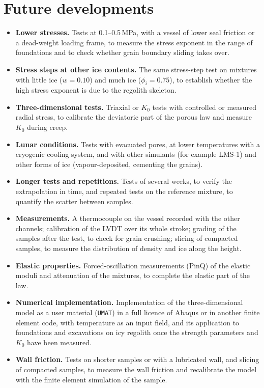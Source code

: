 \section{Future developments}
\begin{itemize}
    \item \textbf{Lower stresses.} Tests at 0.1--0.5\,MPa, with a vessel of lower seal friction or a dead-weight loading frame, to measure the stress exponent in the range of foundations and to check whether grain boundary sliding takes over.
    \item \textbf{Stress steps at other ice contents.} The same stress-step test on mixtures with little ice ($w = 0.10$) and much ice ($\phi_i = 0.75$), to establish whether the high stress exponent is due to the regolith skeleton.
    \item \textbf{Three-dimensional tests.} Triaxial or $K_0$ tests with controlled or measured radial stress, to calibrate the deviatoric part of the porous law and measure $K_0$ during creep.
    \item \textbf{Lunar conditions.} Tests with evacuated pores, at lower temperatures with a cryogenic cooling system, and with other simulants (for example LMS-1) and other forms of ice (vapour-deposited, cementing the grains).
    \item \textbf{Longer tests and repetitions.} Tests of several weeks, to verify the extrapolation in time, and repeated tests on the reference mixture, to quantify the scatter between samples.
    \item \textbf{Measurements.} A thermocouple on the vessel recorded with the other channels; calibration of the LVDT over its whole stroke; grading of the samples after the test, to check for grain crushing; slicing of compacted samples, to measure the distribution of density and ice along the height.
    \item \textbf{Elastic properties.} Forced-oscillation measurements (PinQ) of the elastic moduli and attenuation of the mixtures, to complete the elastic part of the law.
    \item \textbf{Numerical implementation.} Implementation of the three-dimensional model as a user material (\texttt{UMAT}) in a full licence of Abaqus or in another finite element code, with temperature as an input field, and its application to foundations and excavations on icy regolith once the strength parameters and $K_0$ have been measured.
    \item \textbf{Wall friction.} Tests on shorter samples or with a lubricated wall, and slicing of compacted samples, to measure the wall friction and recalibrate the model with the finite element simulation of the sample.
\end{itemize}
